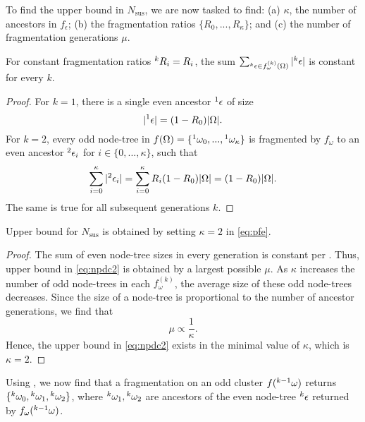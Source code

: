 To find the upper bound in $N_{\text{sus}}$, we are now tasked to find: (a) $\kappa$, the number of ancestors in $f_\epsilon$; (b) the fragmentation ratios $\{R_0, ..., R_\kappa\}$; and (c) the number of fragmentation generations $\mu$. 

\begin{lemma}\label{lem:evenconstant}
  For constant fragmentation ratios ${}^{k}R_i = R_i$, the sum $\sum_{ {}^{k}\epsilon \in f_\omega^{(k)}(\Omega) }{ \lvert{}^{k}\epsilon\rvert}$ is constant for every $k$. 
\end{lemma}
\begin{proof}
  For $k=1$, there is a single even ancestor ${}^{1}\epsilon$ of size 
  \begin{equation*}
    \lvert{}^{1}\epsilon\rvert = (1 - R_0)\lvert\Omega\rvert.
  \end{equation*}
  For $k=2$, every odd node-tree in $f(\Omega)=\{{}^{1}\omega_0,...,{}^{1}\omega_\kappa\}$ is fragmented by $f_\omega$ to an even ancestor ${}^{2}\epsilon_i$ for $i \in \{0,...,\kappa \}$, such that 
  \begin{equation*}
    \sum_{i=0}^{\kappa}{\lvert{}^{2}\epsilon_i\rvert}  = \sum_{i=0}^{\kappa}{R_i(1 - R_0)\lvert\Omega\rvert}= (1 - R_0)\lvert\Omega\rvert.
  \end{equation*}
  The same is true for all subsequent generations $k$. 
\end{proof}

\begin{theorem}\label{the:fragnumber}
  Upper bound for $N_{\text{sus}}$ is obtained by setting $\kappa=2$ in \eqref{eq:pfe}. 
\end{theorem}
\begin{proof}
  The sum of even node-tree sizes in every generation is constant per . Thus, upper bound in \eqref{eq:npdc2} is obtained by a largest possible $\mu$.  As $\kappa$ increases the number of odd node-trees in each $f^{(k)}_\omega$, the average size of these odd node-trees decreases. Since the size of a node-tree is proportional to the number of ancestor generations, we find that 
  \begin{equation*}
    \mu \propto \frac{1}{\kappa}. 
  \end{equation*}
  Hence, the upper bound in \eqref{eq:npdc2} exists in the minimal value of $\kappa$, which is $\kappa = 2$.
\end{proof}

Using , we now find that a fragmentation on an odd cluster $f({}^{k-1}\omega)$ returns $\{{}^{k}\omega_0, {}^{k}\omega_1, {}^{k}\omega_2\}$, where ${}^{k}\omega_1, {}^{k}\omega_2$ are ancestors of the even node-tree ${}^{k}\epsilon$ returned by $f_\omega({}^{k-1}\omega)$. 


